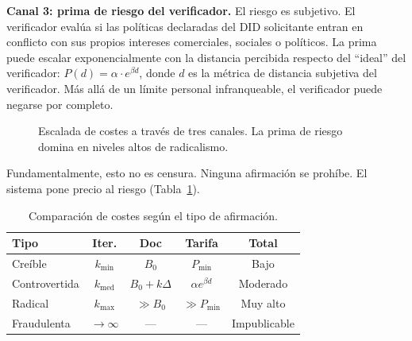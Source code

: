 \documentclass[11pt,a4paper,twocolumn]{article}
\begin{document}
\textbf{Canal 3: prima de riesgo del verificador.} El riesgo es subjetivo. El verificador evalúa si las políticas declaradas del DID solicitante entran en conflicto con sus propios intereses comerciales, sociales o políticos. La prima puede escalar exponencialmente con la distancia percibida respecto del ``ideal'' del verificador: $P(d) = \alpha \cdot e^{\beta d}$, donde $d$ es la métrica de distancia subjetiva del verificador. Más allá de un límite personal infranqueable, el verificador puede negarse por completo.

\begin{figure}[ht]
\centering
{}
\caption{Escalada de costes a través de tres canales. La prima de riesgo domina en niveles altos de radicalismo.}
\label{fig:radicalism}
\end{figure}

Fundamentalmente, esto no es censura. Ninguna afirmación se prohíbe. El sistema pone precio al riesgo (Tabla~\ref{tab:costs}).

\begin{table}[ht]
\centering
\caption{Comparación de costes según el tipo de afirmación.}
\label{tab:costs}
\footnotesize
\begin{tabular}{@{}lcccc@{}}
\toprule
\textbf{Tipo} & \textbf{Iter.} & \textbf{Doc} & \textbf{Tarifa} & \textbf{Total} \\
\midrule
Creíble & $k_{\min}$ & $B_0$ & $P_{\min}$ & Bajo \\
Controvertida & $k_{\text{med}}$ & $B_0{+}k\Delta$ & $\alpha e^{\beta d}$ & Moderado \\
Radical & $k_{\max}$ & $\gg B_0$ & $\gg P_{\min}$ & Muy alto \\
Fraudulenta & $\to\infty$ & --- & --- & Impublicable \\
\bottomrule
\end{tabular}
\end{table}
\end{document}
